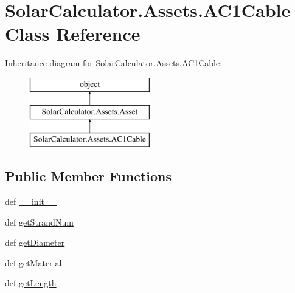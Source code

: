 \hypertarget{class_solar_calculator_1_1_assets_1_1_a_c1_cable}{\section{Solar\-Calculator.\-Assets.\-A\-C1\-Cable Class Reference}
\label{class_solar_calculator_1_1_assets_1_1_a_c1_cable}
}
Inheritance diagram for Solar\-Calculator.\-Assets.\-A\-C1\-Cable\-:\begin{figure}[H]
\begin{center}
\leavevmode
\includegraphics[height=3.000000cm]{class_solar_calculator_1_1_assets_1_1_a_c1_cable}
\end{center}
\end{figure}
\subsection*{Public Member Functions}
\begin{DoxyCompactItemize}
\item 
def \hyperlink{class_solar_calculator_1_1_assets_1_1_a_c1_cable_acf927ef3fcd7fc45d9d4edf1d025f7c3}{\-\_\-\-\_\-init\-\_\-\-\_\-}
\item 
def \hyperlink{class_solar_calculator_1_1_assets_1_1_a_c1_cable_a362a2ad4b205082b8d8673f3411538ad}{get\-Strand\-Num}
\item 
def \hyperlink{class_solar_calculator_1_1_assets_1_1_a_c1_cable_a15dc33c962370abb31b0af4eaaec160f}{get\-Diameter}
\item 
def \hyperlink{class_solar_calculator_1_1_assets_1_1_a_c1_cable_a31eee8bd9a4481e46783b432a0be4bc7}{get\-Material}
\item 
def \hyperlink{class_solar_calculator_1_1_assets_1_1_a_c1_cable_aa28c97b3b106b6dfc73ded8b95408883}{get\-Length}
\end{DoxyCompactItemize}
